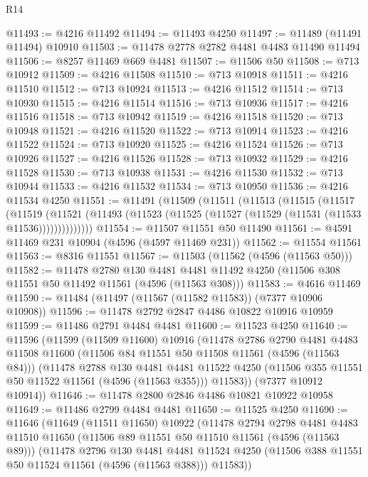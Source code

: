 \begin{lexlean}{R14}
\begin{coremodule}
@11493 := @4216 @11492
@11494 := @11493 @4250
@11497 := @11489 (@11491 @11494) @10910
@11503 := @11478 @2778 @2782 @4481 @4483 @11490 @11494
@11506 := @8257 @11469 @669 @4481
@11507 := @11506 @50
@11508 := @713 @10912
@11509 := @4216 @11508
@11510 := @713 @10918
@11511 := @4216 @11510
@11512 := @713 @10924
@11513 := @4216 @11512
@11514 := @713 @10930
@11515 := @4216 @11514
@11516 := @713 @10936
@11517 := @4216 @11516
@11518 := @713 @10942
@11519 := @4216 @11518
@11520 := @713 @10948
@11521 := @4216 @11520
@11522 := @713 @10914
@11523 := @4216 @11522
@11524 := @713 @10920
@11525 := @4216 @11524
@11526 := @713 @10926
@11527 := @4216 @11526
@11528 := @713 @10932
@11529 := @4216 @11528
@11530 := @713 @10938
@11531 := @4216 @11530
@11532 := @713 @10944
@11533 := @4216 @11532
@11534 := @713 @10950
@11536 := @4216 @11534 @4250
@11551 := @11491
    (@11509
      (@11511
        (@11513
          (@11515
            (@11517
              (@11519
                (@11521 (@11493 (@11523 (@11525 (@11527 (@11529 (@11531 (@11533 @11536))))))))))))))
@11554 := @11507 @11551 @50 @11490
@11561 := @4591 @11469 @231 @10904 (@4596 (@4597 @11469 @231))
@11562 := @11554 @11561
@11563 := @8316 @11551
@11567 := @11503 (@11562 (@4596 (@11563 @50)))
@11582 := @11478
    @2780
    @130
    @4481
    @4481
    @11492
    @4250
    (@11506 @308 @11551 @50 @11492 @11561 (@4596 (@11563 @308)))
@11583 := @4616 @11469
@11590 := @11484 (@11497 (@11567 (@11582 @11583)) (@7377 @10906 @10908))
@11596 := @11478 @2792 @2847 @4486 @10822 @10916 @10959
@11599 := @11486 @2791 @4484 @4481
@11600 := @11523 @4250
@11640 := @11596
    (@11599
      (@11509 @11600)
      @10916
      (@11478
        @2786
        @2790
        @4481
        @4483
        @11508
        @11600
        (@11506 @84 @11551 @50 @11508 @11561 (@4596 (@11563 @84)))
        (@11478
          @2788
          @130
          @4481
          @4481
          @11522
          @4250
          (@11506 @355 @11551 @50 @11522 @11561 (@4596 (@11563 @355)))
          @11583))
      (@7377 @10912 @10914))
@11646 := @11478 @2800 @2846 @4486 @10821 @10922 @10958
@11649 := @11486 @2799 @4484 @4481
@11650 := @11525 @4250
@11690 := @11646
    (@11649
      (@11511 @11650)
      @10922
      (@11478
        @2794
        @2798
        @4481
        @4483
        @11510
        @11650
        (@11506 @89 @11551 @50 @11510 @11561 (@4596 (@11563 @89)))
        (@11478
          @2796
          @130
          @4481
          @4481
          @11524
          @4250
          (@11506 @388 @11551 @50 @11524 @11561 (@4596 (@11563 @388)))
          @11583))

\end{coremodule}
\end{lexlean}
